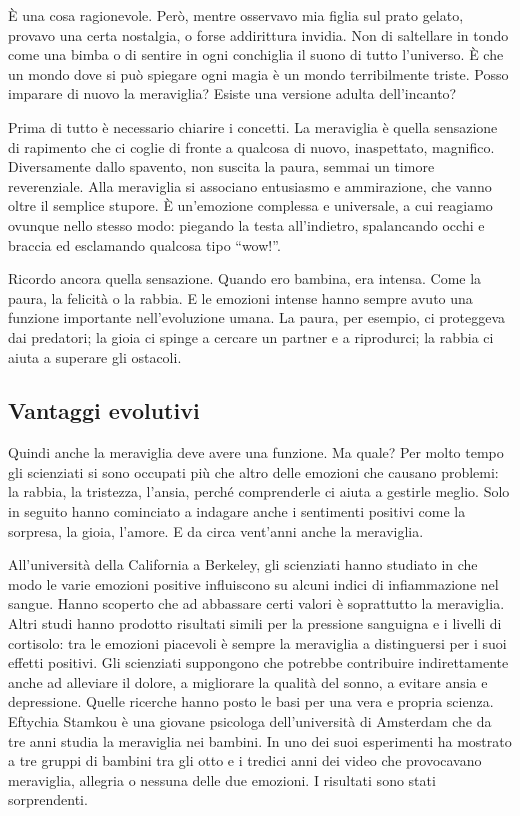 \documentclass[11pt]{report}
\begin{document}
È una cosa ragionevole. Però, mentre osservavo mia figlia sul prato gelato, provavo una certa nostalgia, o forse addirittura invidia. Non di saltellare in tondo come una bimba o di sentire in ogni conchiglia il suono di tutto l’universo. È che un mondo dove si può spiegare ogni magia è un mondo terribilmente triste. Posso imparare di nuovo la meraviglia? Esiste una versione adulta dell’incanto?

Prima di tutto è necessario chiarire i concetti. La meraviglia è quella sensazione di rapimento che ci coglie di fronte a qualcosa di nuovo, inaspettato, magnifico. Diversamente dallo spavento, non suscita la paura, semmai un timore reverenziale. Alla meraviglia si associano entusiasmo e ammirazione, che vanno oltre il semplice stupore. È un’emozione complessa e universale, a cui reagiamo ovunque nello stesso modo: piegando la testa all’indietro, spalancando occhi e braccia ed esclamando qualcosa tipo “wow!”.

Ricordo ancora quella sensazione. Quando ero bambina, era intensa. Come la paura, la felicità o la rabbia. E le emozioni intense hanno sempre avuto una funzione importante nell’evoluzione umana. La paura, per esempio, ci proteggeva dai predatori; la gioia ci spinge a cercare un partner e a riprodurci; la rabbia ci aiuta a superare gli ostacoli.

\subsection*{Vantaggi evolutivi}

Quindi anche la meraviglia deve avere una funzione. Ma quale? Per molto tempo gli scienziati si sono occupati più che altro delle emozioni che causano problemi: la rabbia, la tristezza, l’ansia, perché comprenderle ci aiuta a gestirle meglio. Solo in seguito hanno cominciato a indagare anche i sentimenti positivi come la sorpresa, la gioia, l’amore. E da circa vent’anni anche la meraviglia.

All’università della California a Berkeley, gli scienziati hanno studiato in che modo le varie emozioni positive influiscono su alcuni indici di infiammazione nel sangue. Hanno scoperto che ad abbassare certi valori è soprattutto la meraviglia. Altri studi hanno prodotto risultati simili per la pressione sanguigna e i livelli di cortisolo: tra le emozioni piacevoli è sempre la meraviglia a distinguersi per i suoi effetti positivi. Gli scienziati suppongono che potrebbe contribuire indirettamente anche ad alleviare il dolore, a migliorare la qualità del sonno, a evitare ansia e depressione. Quelle ricerche hanno posto le basi per una vera e propria scienza. Eftychia Stamkou è una giovane psicologa dell’università di Amsterdam che da tre anni studia la meraviglia nei bambini. In uno dei suoi esperimenti ha mostrato a tre gruppi di bambini tra gli otto e i tredici anni dei video che provocavano meraviglia, allegria o nessuna delle due emozioni. I risultati sono stati sorprendenti.
\end{document}
